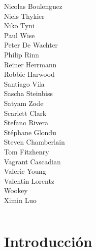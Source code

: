 \documentclass[14pt,aspectratio=169]{beamer}
\begin{document}
\begin{frame}
\begin{center}
\begin{columns}
    Nicolas Boulenguez \\
    {Niels Thykier} \\
    Niko Tyni \\
    {Paul Wise} \\
    Peter De Wachter \\
    Philip Rinn \\
    {Reiner Herrmann} \\
    Robbie Harwood \\
    {Santiago Vila} \\
    {Sascha Steinbiss} \\
    {Satyam Zode} \\
    {Scarlett Clark} \\
    {Stefano Rivera} \\
    {Stéphane Glondu} \\
    {Steven Chamberlain} \\
    Tom Fitzhenry \\
    Vagrant Cascadian \\
    {Valerie Young} \\
    Valentin Lorentz \\
    {Wookey} \\
    {Ximin Luo} \\
  \end{columns}
 \end{center}
\end{frame}

\section{Introducción}
\end{document}
